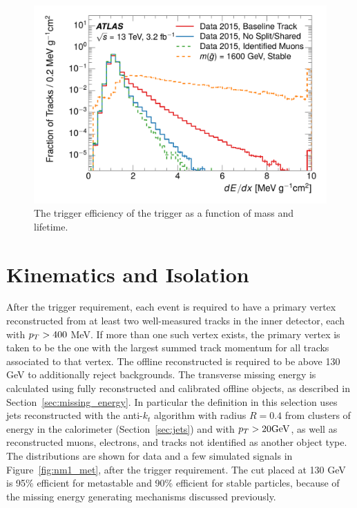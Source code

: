 \begin{figure}[h]
\centering
\includegraphics[draft, width=.68\textwidth]{figures/trigger_efficiency.pdf}
\caption{The trigger efficiency of the \met trigger as a function of mass and lifetime.}
\label{fig:trigger_efficiency}
\end{figure}


\section{Kinematics and Isolation}
\label{sec:track_requirements}

After the trigger requirement, each event is required to have a primary vertex reconstructed from at least two well-measured tracks in the inner detector, each with $p_T > 400$ MeV. 
If more than one such vertex exists, the primary vertex is taken to be the one with the largest summed track momentum for all tracks associated to that vertex. 
The offline reconstructed \met is required to be above 130 GeV to additionally reject \SM backgrounds.
The transverse missing energy is calculated using fully reconstructed and calibrated offline objects, as described in Section~\ref{sec:missing_energy}. 
In particular the \met definition in this selection uses jets reconstructed with the anti-$k_t$ algorithm with radius $R = 0.4$ from clusters of energy in the calorimeter (Section~\ref{sec:jets}) and with $p_T > 20 \mathrm{Ge\kern -0.05em V}$, as well as reconstructed muons, electrons, and tracks not identified as another object type.
The \met distributions are shown for data and a few simulated signals in Figure~\ref{fig:nm1_met}, after the trigger requirement.
The cut placed at 130 GeV is 95\% efficient for metastable and 90\% efficient for stable particles, because of the missing energy generating mechanisms discussed previously.

